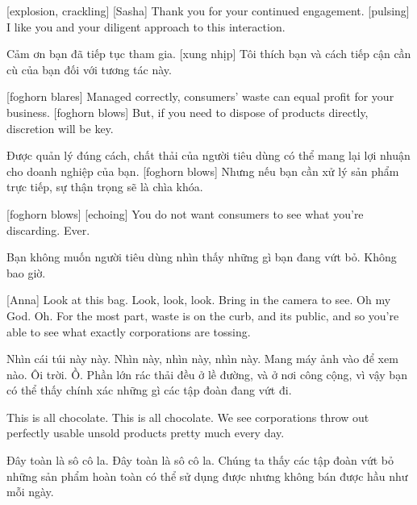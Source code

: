 \documentclass[a4paper]{article}
\begin{document}
	[explosion, crackling]
	[Sasha] Thank you for your continued engagement.
	[pulsing]
	I like you and your diligent approach to this interaction.
	
	\begin{vietnamese-v2}
		 Cảm ơn bạn đã tiếp tục tham gia.
		[xung nhịp]
		Tôi thích bạn và cách tiếp cận cần cù của bạn đối với tương tác này.
	\end{vietnamese-v2}
	
	[foghorn blares]
	Managed correctly, consumers' waste can equal profit for your business.
	[foghorn blows]
	But, if you need to dispose of products directly, discretion will be key.
	
	\begin{vietnamese-v2}
		Được quản lý đúng cách, chất thải của người tiêu dùng có thể mang lại lợi nhuận cho doanh nghiệp của bạn.
		[foghorn blows]
		Nhưng nếu bạn cần xử lý sản phẩm trực tiếp, sự thận trọng sẽ là chìa khóa.
	\end{vietnamese-v2}
	
	
	[foghorn blows]
	[echoing] You do not want consumers to see what you're discarding. Ever.
	
	
	\begin{vietnamese-v2}
		 Bạn không muốn người tiêu dùng nhìn thấy những gì bạn đang vứt bỏ. Không bao giờ.
	\end{vietnamese-v2}
	
	[Anna] Look at this bag.
	Look, look, look.
	Bring in the camera to see.
	Oh my God. Oh.
	For the most part, waste is on the curb, and its public, and so you're able to see what exactly corporations are tossing.
	
	\begin{vietnamese-v2}
		[Anna] Nhìn cái túi này này.
		Nhìn này, nhìn này, nhìn này.
		Mang máy ảnh vào để xem nào.
		Ôi trời. Ồ.
		Phần lớn rác thải đều ở lề đường, và ở nơi công cộng, vì vậy bạn có thể thấy chính xác những gì các tập đoàn đang vứt đi.
	\end{vietnamese-v2}
	
	This is all chocolate.
	This is all chocolate.
	We see corporations throw out perfectly usable unsold products pretty much every day.
	
	\begin{vietnamese-v2}
		Đây toàn là sô cô la.
		Đây toàn là sô cô la.
		Chúng ta thấy các tập đoàn vứt bỏ những sản phẩm hoàn toàn có thể sử dụng được nhưng không bán được hầu như mỗi ngày.
	\end{vietnamese-v2}
	
\end{document}
